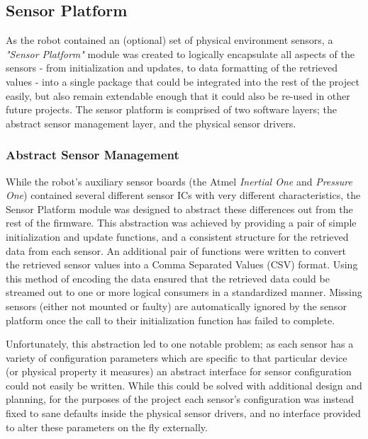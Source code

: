 \FloatBarrier
\subsection{Sensor Platform}

As the robot contained an (optional) set of physical environment sensors, a \textit{"Sensor Platform"} module was created to logically encapsulate all aspects of the sensors - from initialization and updates, to data formatting of the retrieved values - into a single package that could be integrated into the rest of the project easily, but also remain extendable enough that it could also be re-used in other future projects. The sensor platform is comprised of two software layers; the abstract sensor management layer, and the physical sensor drivers.

\FloatBarrier
\subsubsection{Abstract Sensor Management}

While the robot's auxiliary sensor boards (the Atmel \textit{Inertial One} and \textit{Pressure One}) contained several different sensor ICs with very different characteristics, the Sensor Platform module was designed to abstract these differences out from the rest of the firmware. This abstraction was achieved by providing a pair of simple initialization and update functions, and a consistent structure for the retrieved data from each sensor. An additional pair of functions were written to convert the retrieved sensor values into a Comma Separated Values (CSV) format. Using this method of encoding the data ensured that the retrieved data could be streamed out to one or more logical consumers in a standardized manner. Missing sensors (either not mounted or faulty) are automatically ignored by the sensor platform once the call to their initialization function has failed to complete.

Unfortunately, this abstraction led to one notable problem; as each sensor has a variety of configuration parameters which are specific to that particular device (or physical property it measures) an abstract interface for sensor configuration could not easily be written. While this could be solved with additional design and planning, for the purposes of the project each sensor's configuration was instead fixed to sane defaults inside the physical sensor drivers, and no interface provided to alter these parameters on the fly externally.

